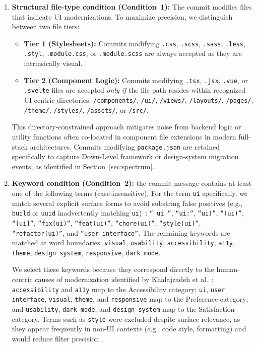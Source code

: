 \documentclass{article}
\begin{document}
\begin{enumerate}
    \item \textbf{Structural file-type condition (Condition~1):} The commit modifies
    files that indicate UI modernizations. To maximize precision, we
    distinguish between two file tiers:
    \begin{itemize}
        \item \textbf{Tier 1 (Stylesheets):} Commits modifying
        \texttt{.css}, \texttt{.scss}, \texttt{.sass}, \texttt{.less},
        \texttt{.styl}, \texttt{.module.css}, or \texttt{.module.scss}
        are always accepted as they are intrinsically visual.
        \item \textbf{Tier 2 (Component Logic):} Commits modifying
        \texttt{.tsx}, \texttt{.jsx}, \texttt{.vue}, or \texttt{.svelte}
        files are accepted \textit{only if} the file path resides within
        recognized UI-centric directories: \texttt{/components/},
        \texttt{/ui/}, \texttt{/views/}, \texttt{/layouts/},
        \texttt{/pages/}, \texttt{/theme/}, \texttt{/styles/},
        \texttt{/assets/}, or \texttt{/src/}.
    \end{itemize}
    This directory-constrained approach mitigates noise from backend
    logic or utility functions often co-located in component file
    extensions in modern full-stack architectures. Commits modifying
    \texttt{package.json} are retained specifically to capture Down-Level
    framework or design-system migration events, as identified in
    Section~\ref{sec:spectrum}.

    \item \textbf{Keyword condition (Condition~2):} the commit message
    contains at least one of the following terms (case-insensitive).
    For the term \texttt{ui} specifically, we match several explicit
    surface forms to avoid substring false positives (e.g.,
    \texttt{build} or \texttt{uuid} inadvertently matching
    \texttt{ui})~\cite{herzig2013}: \texttt{`` ui ''}, \texttt{``ui:''},
    \texttt{``ui)''}, \texttt{``(ui)''}, \texttt{``[ui]''},
    \texttt{``fix(ui)''}, \texttt{``feat(ui)''}, \texttt{``chore(ui)''},
    \texttt{``style(ui)''}, \texttt{``refactor(ui)''}, and
    \texttt{``user interface''}. The remaining keywords are matched at
    word boundaries: \texttt{visual}, \texttt{usability},
    \texttt{accessibility}, \texttt{a11y}, \texttt{theme},
    \texttt{design system}, \texttt{responsive}, \texttt{dark mode}.

    We select these keywords because they correspond directly to the
    human-centric causes of modernization identified by Khalajzadeh
    et al.~\cite{khalajzadeh2022how}: \texttt{accessibility} and
    \texttt{a11y} map to the Accessibility category; \texttt{ui},
    \texttt{user interface}, \texttt{visual}, \texttt{theme}, and
    \texttt{responsive} map to the Preference category; and
    \texttt{usability}, \texttt{dark mode}, and \texttt{design system}
    map to the Satisfaction category. Terms such as \texttt{style} were
    excluded despite surface relevance, as they appear frequently in
    non-UI contexts (e.g., code style, formatting) and would reduce
    filter precision \cite{levin2017}.


\end{enumerate}
\end{document}
